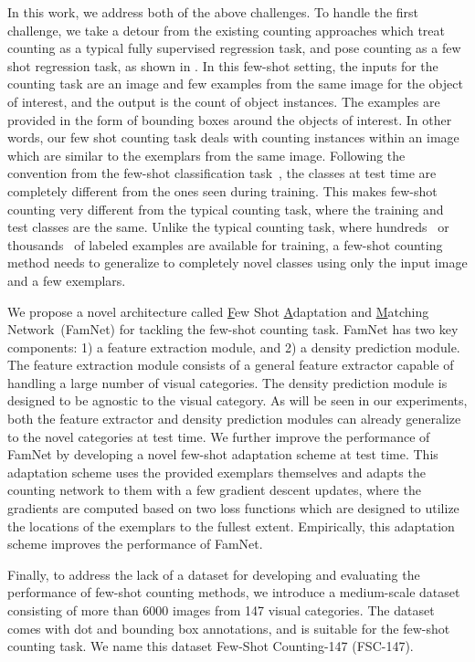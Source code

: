In this work, we address both of the above challenges. To handle the first challenge, we take a detour from the existing counting approaches which treat counting as a typical fully supervised regression task, and pose counting as a few shot regression task, as shown in . In this few-shot setting, the inputs for the counting task are an image and few examples from the same image for the object of interest, and the output is the count of object instances. The examples are provided in the form of bounding boxes around the objects of interest. In other words, our few shot counting task deals with counting instances within an image which are similar to the exemplars from the same image. Following the convention from the few-shot classification task~\cite{Lake-et-al-Science15,vinyals2016matching,finn2017model}, the classes at test time are completely different from the ones seen during training. This makes few-shot counting very different from the typical counting task, where the training and test classes are the same. Unlike the typical counting task, where hundreds~\cite{zhang2016single} or thousands~\cite{idrees2018composition} of labeled examples are available for training, a few-shot counting method needs to generalize to completely novel classes using only the input image and a few exemplars. 

We propose a novel architecture called \underline{F}ew Shot \underline{A}daptation and \underline{M}atching Network~(FamNet) for tackling the few-shot counting task. FamNet has two key components: 1) a feature extraction module, and 2) a density prediction module. The feature extraction module consists of a general feature extractor capable of handling a large number of visual categories. The density prediction module is designed to be agnostic to the visual category. As will be seen in our experiments, both the feature extractor and density prediction modules can already generalize to the novel categories at test time. We further improve the performance of FamNet by developing a novel few-shot adaptation scheme at test time. This adaptation scheme uses the provided exemplars themselves and adapts the counting network to them with a few gradient descent updates, where the gradients are computed based on two loss functions which are designed to utilize the locations of the exemplars to the fullest extent. Empirically, this adaptation scheme improves the performance of FamNet.

Finally, to address the lack of a dataset for developing and evaluating the performance of few-shot counting methods, we introduce a medium-scale dataset consisting of more than 6000 images from 147 visual categories. The dataset comes with dot and bounding box annotations, and is suitable for the few-shot counting task. We name this dataset Few-Shot Counting-147 (FSC-147). 

